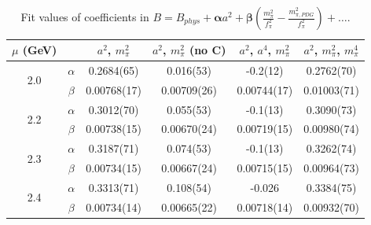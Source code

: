 \documentclass[12pt]{extarticle}
\begin{document}
\begin{table}[h!]
\begin{center}
\begin{tabular}{|c c|c|c|c|c|}
\hline
$\mu$ (GeV) &  & $a^2$, $m_\pi^2$& $a^2$, $m_\pi^2$ (no C)& $a^2$, $a^4$, $m_\pi^2$& $a^2$, $m_\pi^2$, $m_\pi^4$\\
\hline
\multirow{2}{0.5in}{2.0} & $\alpha$ & 0.2684(65)& 0.016(53)& -0.2(12)& 0.2762(70)\\
 & $\beta$ & 0.00768(17)& 0.00709(26)& 0.00744(17)& 0.01003(71)\\
\hline
\multirow{2}{0.5in}{2.2} & $\alpha$ & 0.3012(70)& 0.055(53)& -0.1(13)& 0.3090(73)\\
 & $\beta$ & 0.00738(15)& 0.00670(24)& 0.00719(15)& 0.00980(74)\\
\hline
\multirow{2}{0.5in}{2.3} & $\alpha$ & 0.3187(71)& 0.074(53)& -0.1(13)& 0.3262(74)\\
 & $\beta$ & 0.00734(15)& 0.00667(24)& 0.00715(15)& 0.00964(73)\\
\hline
\multirow{2}{0.5in}{2.4} & $\alpha$ & 0.3313(71)& 0.108(54)& -0.026& 0.3384(75)\\
 & $\beta$ & 0.00734(14)& 0.00665(22)& 0.00718(14)& 0.00932(70)\\
\hline
\end{tabular}
\caption{Fit values of coefficients in $B = B_{phys} + \mathbf{\alpha} a^2 + \mathbf{\beta}\left(\frac{m_\pi^2}{f_\pi^2}-\frac{m_{\pi,PDG}^2}{f_\pi^2}\right) + \ldots$.}
\end{center}
\end{table}
















\clearpage
\end{document}

